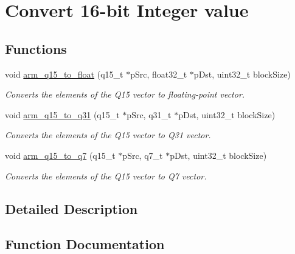 \hypertarget{group__q15__to__x}{}\section{Convert 16-\/bit Integer value}
\label{group__q15__to__x}
\subsection*{Functions}
\begin{DoxyCompactItemize}
\item 
void \hyperlink{group__q15__to__x_gaf8b0d2324de273fc430b0e61ad4e9eb2}{arm\+\_\+q15\+\_\+to\+\_\+float} (q15\+\_\+t $\ast$p\+Src, float32\+\_\+t $\ast$p\+Dst, uint32\+\_\+t block\+Size)
\begin{DoxyCompactList}\small\item\em Converts the elements of the Q15 vector to floating-\/point vector. \end{DoxyCompactList}\item 
void \hyperlink{group__q15__to__x_ga7ba2d87366990ad5380439e2b4a4c0a5}{arm\+\_\+q15\+\_\+to\+\_\+q31} (q15\+\_\+t $\ast$p\+Src, q31\+\_\+t $\ast$p\+Dst, uint32\+\_\+t block\+Size)
\begin{DoxyCompactList}\small\item\em Converts the elements of the Q15 vector to Q31 vector. \end{DoxyCompactList}\item 
void \hyperlink{group__q15__to__x_ga8fb31855ff8cce09c2ec9308f48ded69}{arm\+\_\+q15\+\_\+to\+\_\+q7} (q15\+\_\+t $\ast$p\+Src, q7\+\_\+t $\ast$p\+Dst, uint32\+\_\+t block\+Size)
\begin{DoxyCompactList}\small\item\em Converts the elements of the Q15 vector to Q7 vector. \end{DoxyCompactList}\end{DoxyCompactItemize}


\subsection{Detailed Description}


\subsection{Function Documentation}
